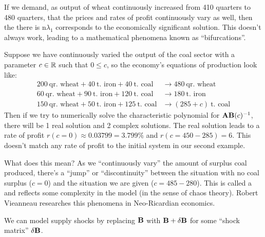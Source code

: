 If we demand, as output of wheat continuously increased from 410
quarters to 480 quarters, that the prices and rates of profit
continuously vary as well, then the there is n$\lambda_{1}$ corresponds to the
economically significant solution. This doesn't always work, leading to
a mathematical phenomena known as ``bifurcations''.

Suppose we have continuously varied the output of the coal sector with a
parameter $c\in\mathbb{R}$ such that $0\leq c$, so the economy's equations of
production look like:
  \begin{subequations}
    \begin{align}
      200~\mbox{qr. wheat} + 40~\mbox{t. iron} + 40~\mbox{t. coal} &\to 480~\mbox{qr. wheat}\\
      60~\mbox{qr. wheat} + 90~\mbox{t. iron} + 120~\mbox{t. coal} &\to 180~\mbox{t. iron}\\
      150~\mbox{qr. wheat} + 50~\mbox{t. iron} + 125~\mbox{t. coal} &\to (285+c)~\mbox{t. coal}
    \end{align}
  \end{subequations}
Then if we try to numerically solve the characteristic polynomial for
$\mathbf{A}\mathbf{B}(c)^{-1}$, there will be 1 real solution and 2 complex
solutions. The real solution leads to a rate of profit
$r(c=0)\approx0.03799=3.799\%$ and $r(c=450-285)=6$. This doesn't match
any rate of profit to the initial system in our second example.

What does this mean? As we ``continuously vary'' the amount of surplus
coal produced, there's a ``jump'' or ``discontinuity'' between the
situation with no coal surplus ($c=0$) and the situation we are given
($c=485-280$). This is called a  and reflects some
complexity in the model (in the sense of chaos theory). Robert Vieanneau
researches this phenomena in Neo-Ricardian economics.
  
We can model supply shocks by replacing $\mathbf{B}$ with
$\mathbf{B}+\delta\mathbf{B}$ for some ``shock matrix'' $\delta\mathbf{B}$.


